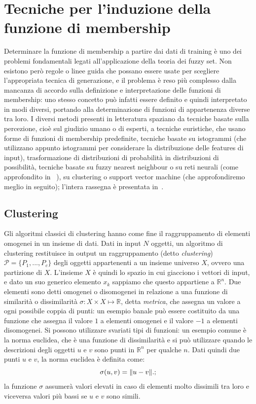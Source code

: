 \documentclass[oneside, openany]{book}
\DeclarePairedDelimiter{\norma}{\lVert}{\rVert}
\begin{document}
		\chapter[Induzione della funzione di membership]{Tecniche per l'induzione della funzione di membership}
		\label{chap:2}
		Determinare la funzione di membership a partire dai dati di training è uno dei problemi fondamentali legati all'applicazione della teoria dei fuzzy set. Non esistono però regole o linee guida che possano essere usate per scegliere l'appropriata tecnica di generazione, e il problema è reso più complesso dalla mancanza di accordo sulla definizione e interpretazione delle funzioni di membership: uno stesso concetto può infatti essere definito e quindi interpretato in modi diversi, portando alla determinazione di funzioni di appartenenza diverse tra loro. I diversi metodi presenti in letteratura spaziano da tecniche basate sulla percezione, cioè sul giudizio umano o di esperti, a tecniche euristiche, che usano forme di funzioni di membership predefinite, tecniche basate su istogrammi (che utilizzano appunto istogrammi per considerare la distribuzione delle features di input), trasformazione di distribuzioni di probabilità in distribuzioni di possibilità, tecniche basate su fuzzy nearest neighbour o su reti neurali (come approfondito in ~\cite{bib:rita}), su clustering o support vector machine (che approfondiremo meglio in seguito); l'intera rassegna è presentata in~\cite{bib:rassegna}.
		
		\section{Clustering}
		Gli algoritmi classici di clustering hanno come fine il raggruppamento di elementi omogenei in un insieme di dati. Dati in input $N$ oggetti, un algoritmo di clustering restituisce in output un raggruppamento (detto \textit{clustering}) $\mathcal{P}=\{P_1, ..., P_c\}$ degli oggetti appartenenti a un insieme universo $X$, ovvero una partizione di $X$. L'insieme $X$ è quindi lo spazio in cui giacciono i vettori di input, e dato un suo generico elemento $x_k$ sappiamo che questo appartiene a $\mathbb R^n$. Due elementi sono detti omogenei o disomogenei in relazione a una funzione di similarità o dissimilarità $\sigma: X\times X\mapsto \mathbb{R}$, detta \textit{metrica}, che assegna un valore a ogni possibile coppia di punti: un esempio banale può essere costituito da una funzione che assegna il valore $1$ a elementi omogenei e il valore $-1$ a elementi disomogenei. Si possono utilizzare svariati tipi di funzioni: un esempio comune è la norma euclidea, che è una funzione di dissimilarità e si può utilizzare quando le descrizioni degli oggetti $u$ e $v$ sono punti in $\mathbb R^n$ per qualche $n$. Dati quindi due punti $u$ e $v$, la norma euclidea è definita come:
		\[
			\sigma(u, v) = \norma{u - v}\text{.}\text{;}
		\]
		la funzione $\sigma$ assumerà valori elevati in caso di elementi molto dissimili tra loro e viceversa valori più bassi se $u$ e $v$ sono simili.
		
\end{document}
